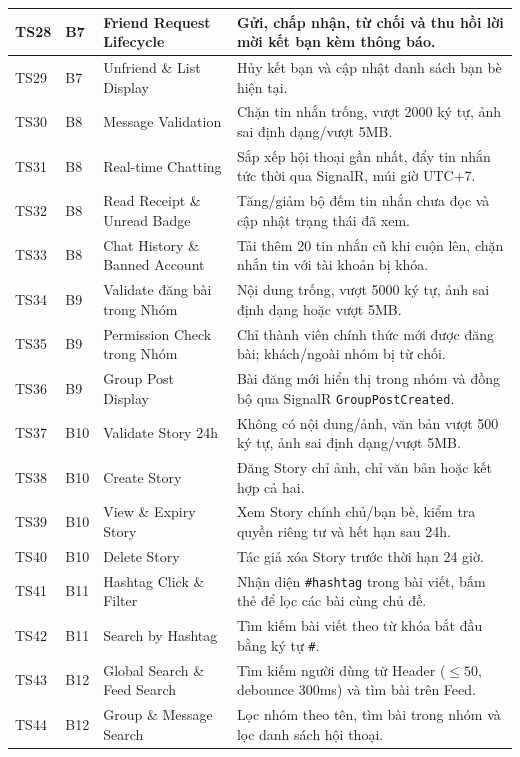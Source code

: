 \documentclass[11pt,a4paper]{article}
\begin{document}
\begin{longtable}{|C{1.3cm}|C{1.2cm}|L{4.8cm}|L{8.5cm}|}
TS28 & B7 & Friend Request Lifecycle & Gửi, chấp nhận, từ chối và thu hồi lời mời kết bạn kèm thông báo. \\ \hline
TS29 & B7 & Unfriend \& List Display & Hủy kết bạn và cập nhật danh sách bạn bè hiện tại. \\ \hline
TS30 & B8 & Message Validation & Chặn tin nhắn trống, vượt 2000 ký tự, ảnh sai định dạng/vượt 5MB. \\ \hline
TS31 & B8 & Real-time Chatting & Sắp xếp hội thoại gần nhất, đẩy tin nhắn tức thời qua SignalR, múi giờ UTC+7. \\ \hline
TS32 & B8 & Read Receipt \& Unread Badge & Tăng/giảm bộ đếm tin nhắn chưa đọc và cập nhật trạng thái đã xem. \\ \hline
TS33 & B8 & Chat History \& Banned Account & Tải thêm 20 tin nhắn cũ khi cuộn lên, chặn nhắn tin với tài khoản bị khóa. \\ \hline
TS34 & B9 & Validate đăng bài trong Nhóm & Nội dung trống, vượt 5000 ký tự, ảnh sai định dạng hoặc vượt 5MB. \\ \hline
TS35 & B9 & Permission Check trong Nhóm & Chỉ thành viên chính thức mới được đăng bài; khách/ngoài nhóm bị từ chối. \\ \hline
TS36 & B9 & Group Post Display & Bài đăng mới hiển thị trong nhóm và đồng bộ qua SignalR \texttt{GroupPostCreated}. \\ \hline
TS37 & B10 & Validate Story 24h & Không có nội dung/ảnh, văn bản vượt 500 ký tự, ảnh sai định dạng/vượt 5MB. \\ \hline
TS38 & B10 & Create Story & Đăng Story chỉ ảnh, chỉ văn bản hoặc kết hợp cả hai. \\ \hline
TS39 & B10 & View \& Expiry Story & Xem Story chính chủ/bạn bè, kiểm tra quyền riêng tư và hết hạn sau 24h. \\ \hline
TS40 & B10 & Delete Story & Tác giả xóa Story trước thời hạn 24 giờ. \\ \hline
TS41 & B11 & Hashtag Click \& Filter & Nhận diện \texttt{\#hashtag} trong bài viết, bấm thẻ để lọc các bài cùng chủ đề. \\ \hline
TS42 & B11 & Search by Hashtag & Tìm kiếm bài viết theo từ khóa bắt đầu bằng ký tự \texttt{\#}. \\ \hline
TS43 & B12 & Global Search \& Feed Search & Tìm kiếm người dùng từ Header ($\le 50$, debounce 300ms) và tìm bài trên Feed. \\ \hline
TS44 & B12 & Group \& Message Search & Lọc nhóm theo tên, tìm bài trong nhóm và lọc danh sách hội thoại. \\ \hline

\end{longtable}
\end{document}
